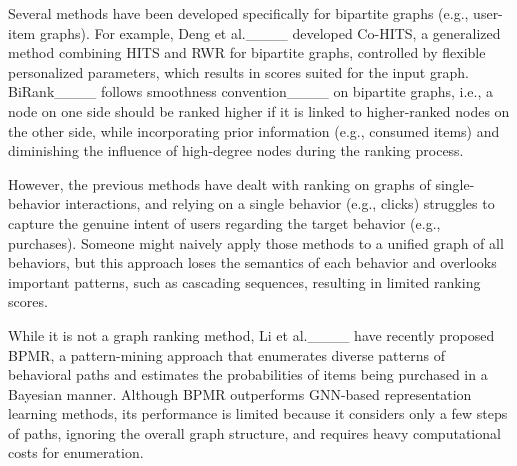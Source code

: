 Several methods have been developed specifically for bipartite graphs (e.g., user-item graphs).
For example, Deng et al.____ developed Co-HITS, a generalized method combining HITS and RWR for bipartite graphs, controlled by flexible personalized parameters, which results in scores suited for the input graph.
BiRank____ follows smoothness convention____ on bipartite graphs, i.e., a node on one side should be ranked higher if it is linked to higher-ranked nodes on the other side, while incorporating prior information (e.g., consumed items) and diminishing the influence of high-degree nodes during the ranking process.

However, the previous methods have dealt with ranking on graphs of single-behavior interactions, and relying on a single behavior (e.g., clicks) struggles to capture the genuine intent of users regarding the target behavior (e.g., purchases).
Someone might naively apply those methods to a unified graph of all behaviors, but this approach loses the semantics of each behavior and overlooks important patterns, such as cascading sequences, resulting in limited ranking scores.

While it is not a graph ranking method, Li et al.____ have recently proposed BPMR, a pattern-mining approach that enumerates diverse patterns of behavioral paths and estimates the probabilities of items being purchased in a Bayesian manner.
Although BPMR outperforms GNN-based representation learning methods, its performance is limited because it considers only a few steps of paths, ignoring the overall graph structure, and requires heavy computational costs for enumeration.